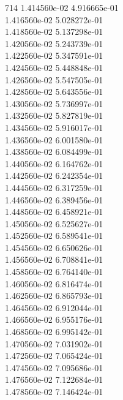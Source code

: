 714	1.414560e-02	4.916665e-01	\\ 	1.416560e-02	5.028272e-01	\\ 	1.418560e-02	5.137298e-01	\\ 	1.420560e-02	5.243739e-01	\\ 	1.422560e-02	5.347591e-01	\\ 	1.424560e-02	5.448848e-01	\\ 	1.426560e-02	5.547505e-01	\\ 	1.428560e-02	5.643556e-01	\\ 	1.430560e-02	5.736997e-01	\\ 	1.432560e-02	5.827819e-01	\\ 	1.434560e-02	5.916017e-01	\\ 	1.436560e-02	6.001580e-01	\\ 	1.438560e-02	6.084499e-01	\\ 	1.440560e-02	6.164762e-01	\\ 	1.442560e-02	6.242354e-01	\\ 	1.444560e-02	6.317259e-01	\\ 	1.446560e-02	6.389456e-01	\\ 	1.448560e-02	6.458921e-01	\\ 	1.450560e-02	6.525627e-01	\\ 	1.452560e-02	6.589541e-01	\\ 	1.454560e-02	6.650626e-01	\\ 	1.456560e-02	6.708841e-01	\\ 	1.458560e-02	6.764140e-01	\\ 	1.460560e-02	6.816474e-01	\\ 	1.462560e-02	6.865793e-01	\\ 	1.464560e-02	6.912044e-01	\\ 	1.466560e-02	6.955176e-01	\\ 	1.468560e-02	6.995142e-01	\\ 	1.470560e-02	7.031902e-01	\\ 	1.472560e-02	7.065424e-01	\\ 	1.474560e-02	7.095686e-01	\\ 	1.476560e-02	7.122684e-01	\\ 	1.478560e-02	7.146424e-01	\\ \hline
